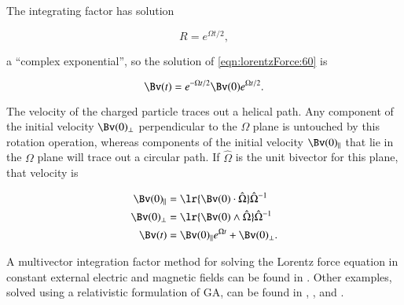 The integrating factor has solution

\begin{dmath}\label{eqn:lorentzForce:180}
R = e^{\Omega t/2},
\end{dmath}

a ``complex exponential'', so the solution of \cref{eqn:lorentzForce:60} is

\begin{dmath}\label{eqn:lorentzForce:200}
\Bv(t) = e^{-\Omega t/2} \Bv(0) e^{\Omega t/2}.
\end{dmath}

The velocity of the charged particle traces out a helical path.
Any component of the initial velocity \( \Bv(0)_\perp \) perpendicular to the \( \Omega \) plane is untouched by this rotation operation, whereas components of the initial velocity \( \Bv(0)_\parallel \) that lie in the \( \Omega \) plane will trace out a circular path.
If \( \hat{\Omega} \) is the unit bivector for this plane, that velocity is

\begin{dmath}\label{eqn:lorentzForce:220}
\begin{aligned}
\Bv(0)_\parallel &= \lr{ \Bv(0) \cdot \hat{\Omega} } \hat{\Omega}^{-1} \\
\Bv(0)_\perp &= \lr{ \Bv(0) \wedge \hat{\Omega} } \hat{\Omega}^{-1} \\
\Bv(t) &= \Bv(0)_\parallel e^{\Omega t} + \Bv(0)_\perp.
\end{aligned}
\end{dmath}

A multivector integration factor method for solving the Lorentz force equation in constant external electric and magnetic fields can be found in \citep{hestenes1999nfc}.  Other examples, solved using a relativistic formulation of GA, can be found in \citep{doran2003gap},
\citep{hestenes1974properdynamics}, and
\citep{hestenes1974propermechanics}.
